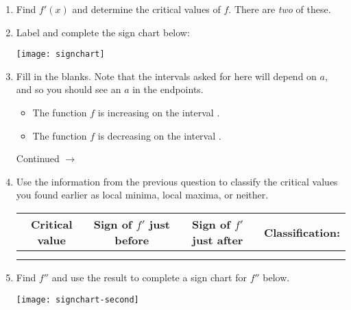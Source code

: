 \documentclass[11pt]{article}
\def\ra{\rightarrow}
\def\blank{\underline{\hspace{1in}}}
\def\pageturn{\vfill 
\begin{flushright}
	\begin{small}
		Continued $\ra$
	\end{small}
\end{flushright} \newpage}
\begin{document}
\begin{enumerate}
	\item Find $f'(x)$ and determine the critical values of $f$. There are \emph{two} of these.
	
	\vspace{1in}
	
	\item Label and complete the sign chart below: 
	\begin{center}
		\texttt{[image: signchart]}
	\end{center}
	
	\item Fill in the blanks. Note that the intervals asked for here will depend on $a$, and so you should see an $a$ in the endpoints. 
	
	\begin{itemize}
		\item The function $f$ is increasing on the interval \blank.
		\item The function $f$ is decreasing on the interval \blank. 
	\end{itemize}
	
	\pageturn
	
	\item Use the information from the previous question to classify the critical values you found earlier as local minima, local maxima, or neither. 
	
	\begin{center}
		\begin{tabular}{c||c|c|c}
		Critical value & Sign of $f'$ just before  & Sign of $f'$ just after & Classification:  \\ \hline
		\hspace{0.5in} & \hspace{0.5in} & \hspace{0.5in} & \hspace{0.5in}  \\ \hline
		\hspace{0.5in} & \hspace{0.5in} & \hspace{0.5in} & \hspace{0.5in}  		
		\end{tabular}
	\end{center}
	
	
	\item Find $f''$ and use the result to complete a sign chart for $f''$ below. 
	\begin{center}
		\texttt{[image: signchart-second]}
	\end{center}
	

\end{enumerate}
\end{document}

